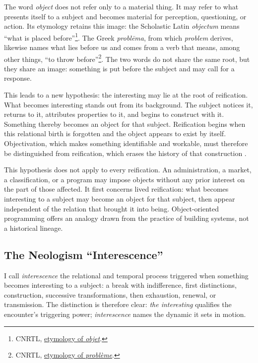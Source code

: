 \documentclass[11pt,a4paper]{article}
\begin{document}
The word \emph{object} does not refer only to a material thing. It may refer to
what presents itself to a subject and becomes material for perception,
questioning, or action. Its etymology retains this image: the Scholastic Latin
\emph{objectum} means ``what is placed before''\footnote{CNRTL,
\href{https://www.cnrtl.fr/etymologie/objet}{etymology of \emph{objet}}.}.
The Greek \emph{problēma}, from which \emph{problem} derives, likewise names
what lies before us and comes from a verb that means, among other things, ``to
throw before''\footnote{CNRTL,
\href{https://www.cnrtl.fr/etymologie/probleme}{etymology of
\emph{problème}}.}. The two words do not share the same root, but they share an
image: something is put before the subject and may call for a response.

This leads to a new hypothesis: the interesting may lie at the root of
reification. What becomes interesting stands out from its background. The
subject notices it, returns to it, attributes properties to it, and begins to
construct with it. Something thereby becomes an object for that subject.
Reification begins when this relational birth is forgotten and the object
appears to exist by itself. Objectivation, which makes something identifiable
and workable, must therefore be distinguished from reification, which erases
the history of that construction \parencite{pachet2004reification}.

This hypothesis does not apply to every reification. An administration, a
market, a classification, or a program may impose objects without any prior
interest on the part of those affected. It first concerns lived reification:
what becomes interesting to a subject may become an object for that subject,
then appear independent of the relation that brought it into being.
Object-oriented programming offers an analogy drawn from the practice of
building systems, not a historical lineage.

\subsection{The Neologism ``Interescence''}

I call \emph{interescence} the relational and temporal process triggered when
something becomes interesting to a subject: a break with indifference, first
distinctions, construction, successive transformations, then exhaustion,
renewal, or transmission. The distinction is therefore clear: \emph{the
interesting} qualifies the encounter's triggering power; \emph{interescence}
names the dynamic it sets in motion.
\end{document}
